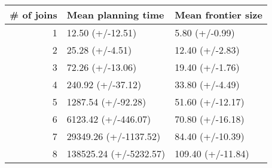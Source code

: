 \begin{tabular}{rll}
\toprule
 \# of joins &      Mean planning time & Mean frontier size \\
\midrule
          1 &        12.50 (+/-12.51) &     5.80 (+/-0.99) \\
          2 &         25.28 (+/-4.51) &    12.40 (+/-2.83) \\
          3 &        72.26 (+/-13.06) &    19.40 (+/-1.76) \\
          4 &       240.92 (+/-37.12) &    33.80 (+/-4.49) \\
          5 &      1287.54 (+/-92.28) &   51.60 (+/-12.17) \\
          6 &     6123.42 (+/-446.07) &   70.80 (+/-16.18) \\
          7 &   29349.26 (+/-1137.52) &   84.40 (+/-10.39) \\
          8 &  138525.24 (+/-5232.57) &  109.40 (+/-11.84) \\
\bottomrule
\end{tabular}
